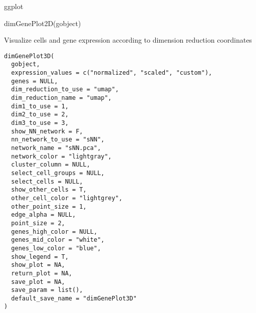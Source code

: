 \documentclass[a4paper]{book}
\begin{document}
%
\begin{Value}
ggplot
\end{Value}
%
\begin{SeeAlso}\relax
{}
\end{SeeAlso}
%
\begin{Examples}
\begin{ExampleCode}
    dimGenePlot2D(gobject)
\end{ExampleCode}
\end{Examples}
%
\begin{Description}\relax
Visualize cells and gene expression according to dimension reduction coordinates
\end{Description}
%
\begin{Usage}
\begin{verbatim}
dimGenePlot3D(
  gobject,
  expression_values = c("normalized", "scaled", "custom"),
  genes = NULL,
  dim_reduction_to_use = "umap",
  dim_reduction_name = "umap",
  dim1_to_use = 1,
  dim2_to_use = 2,
  dim3_to_use = 3,
  show_NN_network = F,
  nn_network_to_use = "sNN",
  network_name = "sNN.pca",
  network_color = "lightgray",
  cluster_column = NULL,
  select_cell_groups = NULL,
  select_cells = NULL,
  show_other_cells = T,
  other_cell_color = "lightgrey",
  other_point_size = 1,
  edge_alpha = NULL,
  point_size = 2,
  genes_high_color = NULL,
  genes_mid_color = "white",
  genes_low_color = "blue",
  show_legend = T,
  show_plot = NA,
  return_plot = NA,
  save_plot = NA,
  save_param = list(),
  default_save_name = "dimGenePlot3D"
)
\end{verbatim}
\end{Usage}
%
\end{document}
